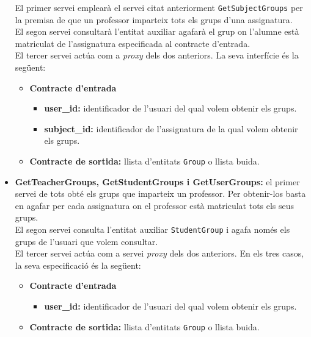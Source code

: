 \begin{itemize}
			El primer servei emplearà el servei citat anteriorment \texttt{GetSubjectGroups} per la premisa de que un professor imparteix tots els grups d'una assignatura.\\
			
			El segon servei consultarà l'entitat auxiliar agafarà el grup on l'alumne està matriculat de l'assignatura especificada al contracte d'entrada.\\
			
			El tercer servei actúa com a \emph{proxy} dels dos anteriors. La seva interfície és la següent:
				\begin{itemize}
					\item \textbf{Contracte d'entrada}
						\begin{itemize}
							\item \textbf{user\_id:} identificador de l'usuari del qual volem obtenir els grups.
							\item \textbf{subject\_id:} identificador de l'assignatura de la qual volem obtenir els grups.
						\end{itemize}
					\item \textbf{Contracte de sortida:} llista d'entitats \texttt{Group} o llista buida.
				\end{itemize}
			
			\item \textbf{GetTeacherGroups, GetStudentGroups i GetUserGroups:} el primer servei de tots obté els grups que imparteix un professor. Per obtenir-los basta en agafar per cada assignatura on el professor està matriculat tots els seus grups.\\
			
			El segon servei consulta l'entitat auxiliar \texttt{StudentGroup} i agafa només els grups de l'usuari que volem consultar.\\
			
			El tercer servei actúa com a servei \emph{proxy} dels dos anteriors. En els tres casos, la seva especificació és la següent:
		
			\begin{itemize}
					\item \textbf{Contracte d'entrada}
						\begin{itemize}
							\item \textbf{user\_id:} identificador de l'usuari del qual volem obtenir els grups.
						\end{itemize}
					\item \textbf{Contracte de sortida:} llista d'entitats \texttt{Group} o llista buida.
				\end{itemize}
				
		\end{itemize}
